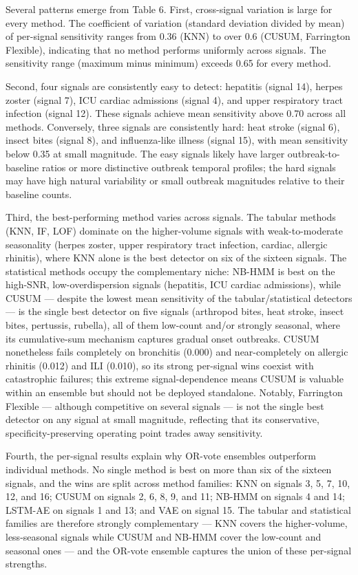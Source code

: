 \documentclass[11pt]{article}
\begin{document}
Several patterns emerge from Table 6. First, cross-signal variation is large for every method. The coefficient of variation (standard deviation divided by mean) of per-signal sensitivity ranges from 0.36 (KNN) to over 0.6 (CUSUM, Farrington Flexible), indicating that no method performs uniformly across signals. The sensitivity range (maximum minus minimum) exceeds 0.65 for every method.

Second, four signals are consistently easy to detect: hepatitis (signal 14), herpes zoster (signal 7), ICU cardiac admissions (signal 4), and upper respiratory tract infection (signal 12). These signals achieve mean sensitivity above 0.70 across all methods. Conversely, three signals are consistently hard: heat stroke (signal 6), insect bites (signal 8), and influenza-like illness (signal 15), with mean sensitivity below 0.35 at small magnitude. The easy signals likely have larger outbreak-to-baseline ratios or more distinctive outbreak temporal profiles; the hard signals may have high natural variability or small outbreak magnitudes relative to their baseline counts.

Third, the best-performing method varies across signals. The tabular methods (KNN, IF, LOF) dominate on the higher-volume signals with weak-to-moderate seasonality (herpes zoster, upper respiratory tract infection, cardiac, allergic rhinitis), where KNN alone is the best detector on six of the sixteen signals. The statistical methods occupy the complementary niche: NB-HMM is best on the high-SNR, low-overdispersion signals (hepatitis, ICU cardiac admissions), while CUSUM --- despite the lowest mean sensitivity of the tabular/statistical detectors --- is the single best detector on five signals (arthropod bites, heat stroke, insect bites, pertussis, rubella), all of them low-count and/or strongly seasonal, where its cumulative-sum mechanism captures gradual onset outbreaks. CUSUM nonetheless fails completely on bronchitis (0.000) and near-completely on allergic rhinitis (0.012) and ILI (0.010), so its strong per-signal wins coexist with catastrophic failures; this extreme signal-dependence means CUSUM is valuable within an ensemble but should not be deployed standalone. Notably, Farrington Flexible --- although competitive on several signals --- is not the single best detector on any signal at small magnitude, reflecting that its conservative, specificity-preserving operating point trades away sensitivity.

Fourth, the per-signal results explain why OR-vote ensembles outperform individual methods. No single method is best on more than six of the sixteen signals, and the wins are split across method families: KNN on signals 3, 5, 7, 10, 12, and 16; CUSUM on signals 2, 6, 8, 9, and 11; NB-HMM on signals 4 and 14; LSTM-AE on signals 1 and 13; and VAE on signal 15. The tabular and statistical families are therefore strongly complementary --- KNN covers the higher-volume, less-seasonal signals while CUSUM and NB-HMM cover the low-count and seasonal ones --- and the OR-vote ensemble captures the union of these per-signal strengths.
\end{document}
